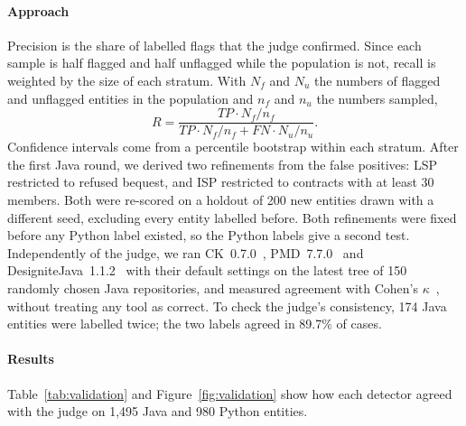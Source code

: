 \documentclass[sigconf]{acmart}
\begin{document}
\paragraph{Approach} Precision is the share of labelled flags that the judge confirmed. Since each
sample is half flagged and half unflagged while the population is not, recall is weighted by the size
of each stratum. With $N_f$ and $N_u$ the numbers of flagged and unflagged entities in the population
and $n_f$ and $n_u$ the numbers sampled,
\begin{equation}
R = \frac{TP \cdot N_f / n_f}{TP \cdot N_f / n_f + FN \cdot N_u / n_u}.
\label{eq:recall}
\end{equation}
Confidence intervals come from a percentile bootstrap within each stratum. After the first Java
round, we derived two refinements from the false positives: LSP restricted to refused bequest, and
ISP restricted to contracts with at least 30 members. Both were re-scored on a holdout of 200 new
entities drawn with a different seed, excluding every entity labelled before. Both refinements were
fixed before any Python label existed, so the Python labels give a second test. Independently of the
judge, we ran CK~0.7.0~\cite{aniche2015ck}, PMD~7.7.0~\cite{pmd} and
DesigniteJava~1.1.2~\cite{sharma2016designite} with their default settings on the latest tree of 150
randomly chosen Java repositories, and measured agreement with Cohen's
$\kappa$~\cite{cohen1960kappa}, without treating any tool as correct. To check the judge's
consistency, 174 Java entities were labelled twice; the two labels agreed in 89.7\% of cases.

\paragraph{Results} Table~\ref{tab:validation} and Figure~\ref{fig:validation} show how each
detector agreed with the judge on 1,495 Java and 980 Python entities.
\end{document}
